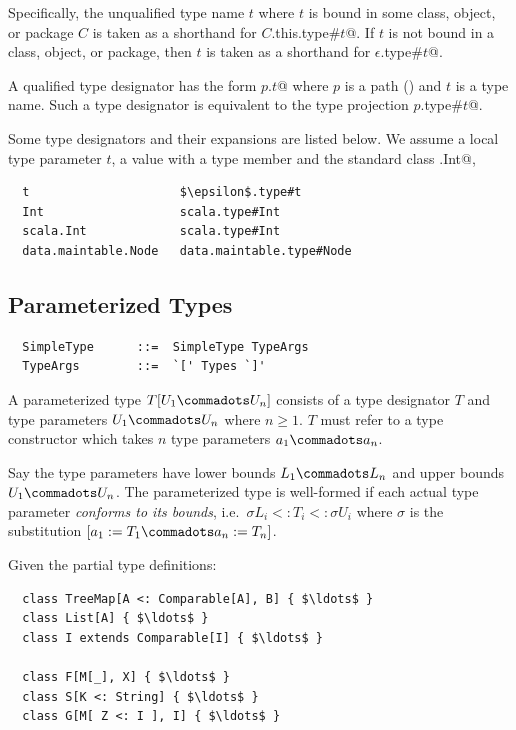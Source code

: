 Specifically, the unqualified type name $t$ where $t$ is bound in some
class, object, or package $C$ is taken as a shorthand for
\lstinline@$C$.this.type#$t$@. If $t$ is
not bound in a class, object, or package, then $t$ is taken as a
shorthand for \lstinline@$\epsilon$.type#$t$@.

A qualified type designator has the form \lstinline@$p$.$t$@ where $p$ is
a path () and $t$ is a type name. Such a type designator is
equivalent to the type projection \lstinline@$p$.type#$t$@.

\example 
Some type designators and their expansions are listed below. We assume
a local type parameter $t$, a value 
with a type member  and the standard class \lstinline@scala.Int@, 
\begin{lstlisting}
  t                     $\epsilon$.type#t
  Int                   scala.type#Int
  scala.Int             scala.type#Int
  data.maintable.Node   data.maintable.type#Node
\end{lstlisting}

\subsection{Parameterized Types}
\label{sec:param-types}

\syntax\begin{lstlisting}
  SimpleType      ::=  SimpleType TypeArgs
  TypeArgs        ::=  `[' Types `]'
\end{lstlisting}

A parameterized type $T[U_1 \commadots U_n]$ consists of a type
designator $T$ and type parameters $U_1 \commadots U_n$ where $n \geq
1$.  $T$ must refer to a type constructor which takes $n$ type
parameters $a_1 \commadots a_n$.

Say the type parameters have lower bounds $L_1 \commadots L_n$ and
upper bounds $U_1 \commadots U_n$.  The parameterized type is
well-formed if each actual type parameter {\em conforms to its
bounds}, i.e.\ $\sigma L_i <: T_i <: \sigma U_i$ where $\sigma$ is the
substitution $[a_1 := T_1 \commadots a_n := T_n]$.

\example\label{ex:param-types}
Given the partial type definitions:

\begin{lstlisting}
  class TreeMap[A <: Comparable[A], B] { $\ldots$ }
  class List[A] { $\ldots$ }
  class I extends Comparable[I] { $\ldots$ }
  
  class F[M[_], X] { $\ldots$ }
  class S[K <: String] { $\ldots$ }
  class G[M[ Z <: I ], I] { $\ldots$ }
\end{lstlisting}

